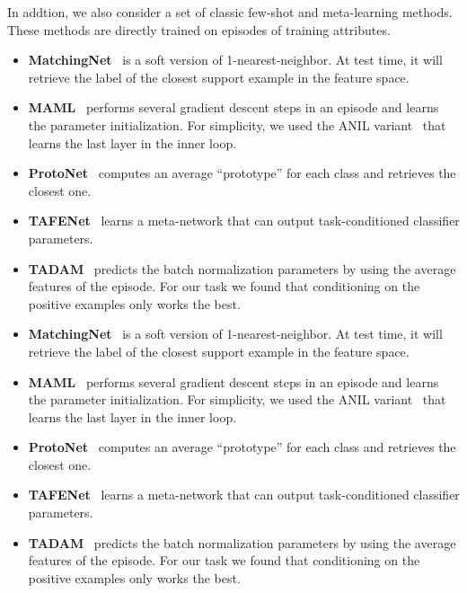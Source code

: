 In addtion, we also consider a set of classic few-shot and meta-learning methods.
These methods are directly trained on \taskname{} episodes of training
attributes.

\iflatexml
\begin{itemize}
\item \textbf{MatchingNet}~\citep{matchingnet} is a soft version of
    1-nearest-neighbor. At test time, it will retrieve the label of the closest
    support example in the feature space.
\item \textbf{MAML}~\citep{maml} performs several gradient descent steps in an
    episode and learns the parameter initialization. For simplicity, we used
    the ANIL variant~\citep{anil} that learns the last layer in the inner loop.
\item \textbf{ProtoNet}~\citep{protonet} computes an average ``prototype'' for
    each class and retrieves the closest one.
\item \textbf{TAFENet}~\citep{tafenet} learns a meta-network that can output
    task-conditioned classifier parameters.
\item \textbf{TADAM}~\citep{tadam} predicts the batch normalization parameters
    by using the average features of the episode. For our task we found that
    conditioning on the positive examples only works the best.
\end{itemize}
\else
\begin{itemize}[leftmargin=*]
\savespacebeforeitem
\item \textbf{MatchingNet}~\citep{matchingnet} is a soft version of
1-nearest-neighbor. At test time, it will retrieve the label of the closest support
example in the feature space.

\savespacebeforeitem
{}
\item \textbf{MAML}~\citep{maml} performs several gradient descent steps in an
episode and learns the parameter initialization. For simplicity, we used the
ANIL variant~\citep{anil} that learns the last layer in the inner loop.

\savespacebeforeitem
\item \textbf{ProtoNet}~\citep{protonet} computes an average ``prototype'' for
each class and retrieves the closest one.

\savespacebeforeitem
\item \textbf{TAFENet}~\citep{tafenet} learns a meta-network that can output
task-conditioned classifier parameters.

\savespacebeforeitem
\item \textbf{TADAM}~\citep{tadam} predicts the batch normalization parameters
by using the average features of the episode. For our task we found that
conditioning on the positive examples only works the best.
\end{itemize}
\fi

